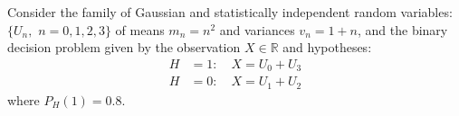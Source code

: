 \else


\question Consider the family of Gaussian and statistically independent random variables:
$\{U_n, \,\,n=0,1,2, 3\}$
of means $m_n = n^2$ and variances $v_n = 1+n$, and the binary decision problem given by the observation $X \in \mathbb{R}$ and hypotheses:
\begin{align*}
    H &=1: \quad X = U_0 + U_3 \\
    H &=0: \quad X = U_1 + U_2
\end{align*}
where $P_H(1) = 0.8$.


